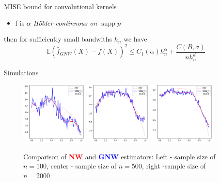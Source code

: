 \documentclass[final,dvipsnames]{beamer}
\newcommand{\myemphh}[1]{\textbf{\textcolor{blue}{#1}}}
\newcommand{\myemphr}[1]{\textbf{\textcolor{red}{#1}}}
\DeclareMathOperator\supp{supp}
\begin{document}
\begin{frame}
\begin{columns}[T]
\begin{column}{0.48\textwidth}
\begin{block}{MISE bound for convolutional kernels}
{\begin{itemize}
        \item f is \textit{$\alpha$ Hölder continnous on $\supp{p}$}
        \end{itemize}
        then for sufficiently small bandwiths $h_n$ we have
            \begin{equation*}
                \mathbb{E}(\hat{f}_{GNW}(X)-f(X))^2\leq C_1(\alpha)h_n^{\alpha}+\frac{C(B,\sigma)}{nh_n^d}
            \end{equation*}}
\end{block}
\begin{block}{Simulations}
    \begin{figure}
        \includegraphics[width=0.3\textwidth]{trueSMALLsample.png}
        \includegraphics[width=0.3\textwidth]{trueMEDsample.png}
        \includegraphics[width=0.3\textwidth]{trueLARGEsample.png}
        \caption{Comparison of \myemphr{NW} and \myemphh{GNW} estimators: Left - sample size of $n=100$, center - sample size of $n=500$, right -sample size of $n=2000$}
    \end{figure}
\end{block}


\end{column}
\end{columns}
\end{frame}
\end{document}
